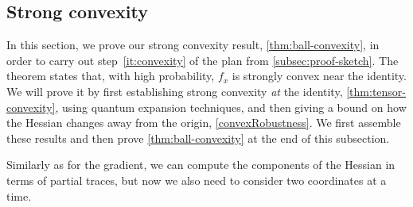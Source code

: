 \documentclass[aos]{imsart}
\theoremstyle{definition}
\numberwithin{equation}{section}
\DeclareMathOperator{\tr}{Tr}
\newcommand{\ot}{\otimes}
\begin{document}
\subsection{Strong convexity}\label{subsec:strong-convex}
In this section, we prove our strong convexity result, \cref{thm:ball-convexity}, in order to carry out step~\ref{it:convexity} of the plan from \cref{subsec:proof-sketch}.
The theorem states that, with high probability, $f_x$ is strongly convex near the identity.
We will prove it by first establishing strong convexity \emph{at} the identity, \cref{thm:tensor-convexity}, using quantum expansion techniques, and then giving a bound on how the Hessian changes away from the origin, \cref{convexRobustness}.
We first assemble these results and then prove \cref{thm:ball-convexity} at the end of this subsection.

Similarly as for the gradient, we can compute the components of the Hessian in terms of partial traces, but now we also need to consider two coordinates at a time.

\end{document}
